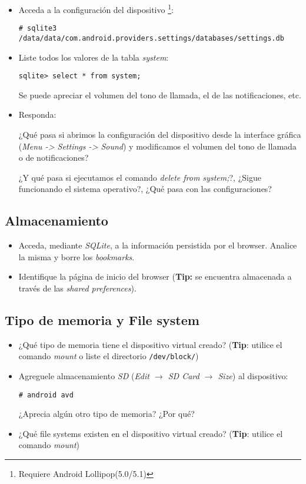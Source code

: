 \begin{itemize}
    \item Acceda a la configuración del dispositivo \footnote{Requiere Android Lollipop(5.0/5.1)}:
    \begin{lstlisting}
# sqlite3 /data/data/com.android.providers.settings/databases/settings.db
    \end{lstlisting}

    \item Liste todos los valores de la tabla \emph{system}:
    \begin{lstlisting}
sqlite> select * from system;
    \end{lstlisting}
    Se puede apreciar el volumen del tono de llamada, el de las notificaciones, etc.    
    
    \item Responda:
    \begin{questions}
  \question ¿Qué pasa si abrimos la configuración del dispositivo desde la interface gráfica (\emph{Menu -> Settings -> Sound}) y modificamos el volumen del tono de llamada o de notificaciones?
  
  \question ¿Y qué pasa si ejecutamos el comando \textit{delete from system;}?, ¿Sigue funcionando el sistema operativo?, ¿Qué pasa con las configuraciones?
    \end{questions}
\end{itemize}

\subsection{Almacenamiento}
\begin{itemize}
    \item Acceda, mediante \textit{SQLite}, a la información persistida por el browser. Analice la misma y borre los \textit{bookmarks}.

    \item Identifique la página de inicio del browser (\textbf{Tip:} se encuentra almacenada a través de las \textit{shared preferences}).    
\end{itemize}

\subsection{Tipo de memoria y File system}
\begin{itemize}
    \item ¿Qué tipo de memoria tiene el dispositivo virtual creado? (\textbf{Tip}: utilice el comando \textit{mount} o liste el directorio \texttt{/dev/block/})
    
    \item Agreguele almacenamiento \textit{SD} (\emph{Edit $\rightarrow$ SD Card $\rightarrow$ Size}) al dispositivo:
    \begin{lstlisting}
# android avd
    \end{lstlisting}
    ¿Aprecia algún otro tipo de memoria? ¿Por qué?   
    
    \item ¿Qué file systems existen en el dispositivo virtual creado? (\textbf{Tip}: utilice el comando \textit{mount})      
\end{itemize}

